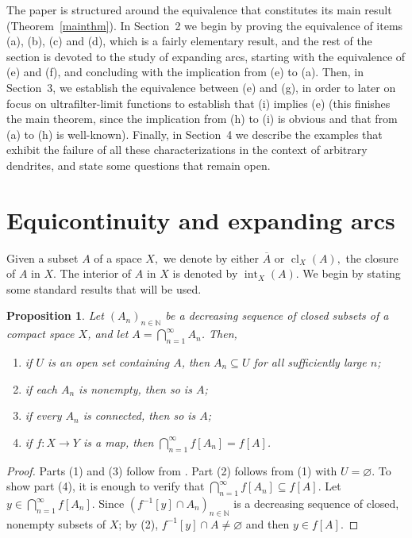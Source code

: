 \documentclass[12pt]{amsart}
\newtheorem{proposition}[theorem]{Proposition}
\theoremstyle{definition}
\numberwithin{equation}{section}
\DeclareMathOperator{\cl}{cl}
\renewcommand{\int}{\mathop{\mathrm{int}}}
\begin{document}
The paper is structured around the equivalence that constitutes its main result (Theorem~\ref{mainthm}). In Section~2 we begin by proving the equivalence of items (a), (b), (c) and (d), which is a fairly elementary result, and the rest of the section is devoted to the study of expanding arcs, starting with the equivalence of (e) and (f), and concluding with the implication from (e) to (a). Then, in Section~3, we establish the equivalence between (e) and (g), in order to later on focus on ultrafilter-limit functions to establish that (i) implies (e) (this finishes the main theorem, since the implication from (h) to (i) is obvious and that from (a) to (h) is well-known). Finally, in Section~4 we 
describe the examples that exhibit the failure of all these characterizations in the context of arbitrary dendrites, and state some questions that remain open.


\section{Equicontinuity and expanding arcs}

Given a subset $A$ of a space $X,$ we denote by either $\overline{A}$ or $\cl_X(A),$ the closure of $A$ in $X.$ 
The interior of $A$ in $X$ is denoted by $\int_X(A).$ We begin by stating some standard results that will be used. 

\begin{proposition}\label{lem:referee}
Let $(A_n)_{n\in\mathbb N}$ be a decreasing sequence of closed subsets of a compact space $X$, and let $A=\bigcap_{n=1}^\infty A_n$. Then,
\begin{enumerate}
\item[\emph{(1)}] if $U$ is an open set containing $A$, then $A_n\subseteq U$ for all sufficiently large $n$;
\item[\emph{(2)}] if each $A_n$ is nonempty, then so is $A$;
\item[\emph{(3)}] if every $A_n$ is connected, then so is $A$;
\item[\emph{(4)}] if $f:X\longrightarrow Y$ is a map, then $\bigcap_{n=1}^\infty f[A_n]=f[A]$.
\end{enumerate}
\end{proposition}
\begin{proof}
Parts (1) and (3) follow from \cite[Corollary~3.1.5 and Corollary~6.1.19]{engelking}. Part (2) follows from
(1) with $U = \varnothing.$ To show part (4), it is enough to verify that $\bigcap_{n=1}^\infty f[A_n] \subseteq f[A]$.
Let $y \in \bigcap_{n=1}^\infty f[A_n].$ Since $(f^{-1}[y] \cap A_n)_{n\in\mathbb N}$ is a decreasing sequence of closed, nonempty subsets of $X$; by (2), $f^{-1}[y] \cap A \ne \varnothing$ and then $y \in f[A].$
\end{proof}
\end{document}

